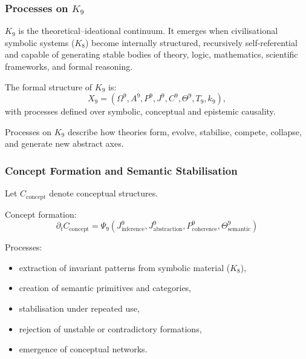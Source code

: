 

\subsubsection{Processes on \texorpdfstring{$K_9$}{K_9}}
\label{sec:processes-k9}

$K_9$ is the theoretical–ideational continuum.  
It emerges when civilisational symbolic systems ($K_8$) become internally
structured, recursively self-referential and capable of generating 
stable bodies of theory, logic, mathematics, scientific frameworks, 
and formal reasoning.

The formal structure of $K_9$ is:
\[
X_9 = (\Omega^9, A^9, P^9, J^9, C^9, \Theta^9, T_9, k_9),
\]
with processes defined over symbolic, conceptual and epistemic causality.

Processes on $K_9$ describe how theories form, evolve, stabilise, 
compete, collapse, and generate new abstract axes.

\subsubsection{Concept Formation and Semantic Stabilisation}

Let $C_{\text{concept}}$ denote conceptual structures.

Concept formation:
\[
\partial_t C_{\text{concept}}
    = \Psi_9(J^9_{\text{inference}}, 
             J^9_{\text{abstraction}}, 
             P^9_{\text{coherence}},
             \Theta^9_{\text{semantic}})
\]

Processes:
\begin{itemize}
    \item extraction of invariant patterns from symbolic material ($K_8$),
    \item creation of semantic primitives and categories,
    \item stabilisation under repeated use,
    \item rejection of unstable or contradictory formations,
    \item emergence of conceptual networks.
\end{itemize}

